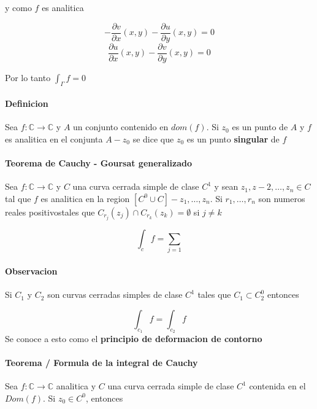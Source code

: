 \documentclass[10pt]{article}
\begin{document}
y como $f$ es analitica

\begin{equation*}
- \dfrac{\partial v}{\partial x}(x, y) -\dfrac{\partial u}{\partial y} (x,y)  = 0
\end{equation*}
\begin{equation*}
\dfrac{\partial u}{\partial x} (x,y) - \dfrac{\partial v}{\partial y}(x,y) = 0
\end{equation*}	

Por lo tanto $\int_{\Gamma} f = 0$	

\paragraph{Definicion} Sea $f: \mathbb{C} \rightarrow \mathbb{C}$ y $A$ un conjunto contenido en $dom(f)$. Si $z_0$ es un punto de $A$ y $f$ es analitica en el conjunta $A - {z_0}$ se dice que $z_0$ es un punto \textbf{singular} de $f$

\paragraph{Teorema de Cauchy - Goursat generalizado} Sea $f: \mathbb{C} \rightarrow \mathbb{C}$ y $C$ una curva cerrada simple de clase $C^1$ y sean $z_1, z-2,\dots, z_n \in C$ tal que $f$ es analitica en la region $[C^0 \cup C] - {z_1,\dots, z_n}$. Si $r_1,\dots ,r_n$ son numeros reales positivostales que $C_{r_j}(z_j) \cap C_{r_k}(z_k) = \emptyset$ si $j \neq k$

\begin{equation}
	\int_c f = \sum_{j=1}
\end{equation}

\paragraph{Observacion} Si $C_1$ y $C_2$ son curvas cerradas simples de clase $C^1$ tales que $C_1\subset C_2^0$ entonces

\begin{equation*}
	\int_{c_1} f = \int_{c_2} f
\end{equation*}
Se conoce a esto como el \textbf{principio de deformacion de contorno}

\paragraph{Teorema / Formula de la integral de Cauchy} Sea $f: \mathbb{C} \rightarrow \mathbb{C}$ analitica y $C$ una curva cerrada simple de clase $C^1$ contenida en el $Dom(f)$. Si $z_0 \in C^0$, entonces 
\end{document}
